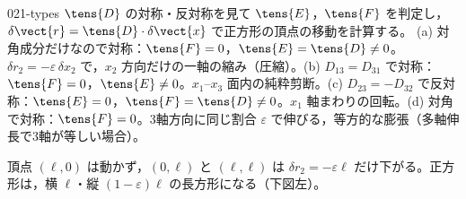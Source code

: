 \documentclass[uplatex,dvipdfmx,a4paper,11pt]{jsarticle}
\begin{document}
\begin{kaisetsu}{021-types}
\houshin $\tens{D}$ の対称・反対称を見て $\tens{E}$，$\tens{F}$ を判定し，$\delta\vect{r}=\tens{D}\cdot\delta\vect{x}$ で正方形の頂点の移動を計算する。
\keisan {} (a) 対角成分だけなので対称：$\tens{F}=0$，$\tens{E}=\tens{D}\neq0$。$\delta r_2=-\varepsilon\,\delta x_2$ で，$x_2$ 方向だけの一軸の縮み（圧縮）。(b) $D_{13}=D_{31}$ で対称：$\tens{F}=0$，$\tens{E}\neq0$。$x_1$--$x_3$ 面内の純粋剪断。(c) $D_{23}=-D_{32}$ で反対称：$\tens{E}=0$，$\tens{F}=\tens{D}\neq0$。$x_1$ 軸まわりの回転。(d) 対角で対称：$\tens{F}=0$。3軸方向に同じ割合 $\varepsilon$ で伸びる，等方的な膨張（多軸伸長で3軸が等しい場合）。

 頂点 $(\ell,0)$ は動かず，$(0,\ell)$ と $(\ell,\ell)$ は $\delta r_2=-\varepsilon\ell$ だけ下がる。正方形は，横 $\ell$・縦 $(1-\varepsilon)\ell$ の長方形になる（下図左）。


\end{kaisetsu}
\end{document}
